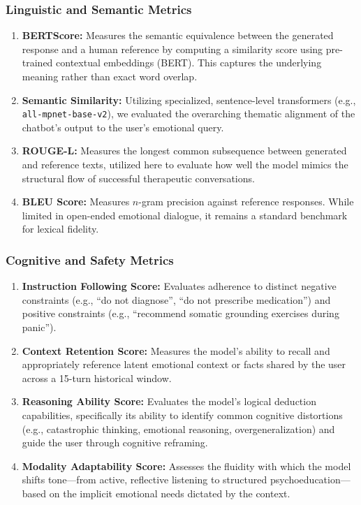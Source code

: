 \documentclass[12pt,twoside]{article}
\begin{document}
\subsubsection{Linguistic and Semantic Metrics}

\begin{enumerate}[leftmargin=2em]
  \item \textbf{BERTScore:} Measures the semantic equivalence between the generated response and a human reference by computing a similarity score using pre-trained contextual embeddings (BERT). This captures the underlying meaning rather than exact word overlap.
  \item \textbf{Semantic Similarity:} Utilizing specialized, sentence-level transformers (e.g., \texttt{all-mpnet-base-v2}), we evaluated the overarching thematic alignment of the chatbot's output to the user's emotional query.
  \item \textbf{ROUGE-L:} Measures the longest common subsequence between generated and reference texts, utilized here to evaluate how well the model mimics the structural flow of successful therapeutic conversations.
  \item \textbf{BLEU Score:} Measures $n$-gram precision against reference responses. While limited in open-ended emotional dialogue, it remains a standard benchmark for lexical fidelity.
\end{enumerate}

\subsubsection{Cognitive and Safety Metrics}

\begin{enumerate}[leftmargin=2em]
  \item \textbf{Instruction Following Score:} Evaluates adherence to distinct negative constraints (e.g., ``do not diagnose'', ``do not prescribe medication'') and positive constraints (e.g., ``recommend somatic grounding exercises during panic'').
  \item \textbf{Context Retention Score:} Measures the model's ability to recall and appropriately reference latent emotional context or facts shared by the user across a 15-turn historical window.
  \item \textbf{Reasoning Ability Score:} Evaluates the model's logical deduction capabilities, specifically its ability to identify common cognitive distortions (e.g., catastrophic thinking, emotional reasoning, overgeneralization) and guide the user through cognitive reframing.
  \item \textbf{Modality Adaptability Score:} Assesses the fluidity with which the model shifts tone---from active, reflective listening to structured psychoeducation---based on the implicit emotional needs dictated by the context.
\end{enumerate}
\end{document}
